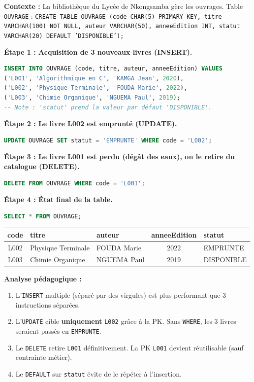 \documentclass[11pt]{article}
\begin{document}
\begin{exoresolu}
\textbf{Contexte :} La bibliothèque du Lycée de Nkongsamba gère les ouvrages. Table \texttt{OUVRAGE} :
\texttt{CREATE TABLE OUVRAGE (code CHAR(5) PRIMARY KEY, titre VARCHAR(100) NOT NULL, auteur VARCHAR(50), anneeEdition INT, statut VARCHAR(20) DEFAULT 'DISPONIBLE');}

\textbf{Étape 1 : Acquisition de 3 nouveaux livres (INSERT).}
\begin{lstlisting}[language=SQL]
INSERT INTO OUVRAGE (code, titre, auteur, anneeEdition) VALUES
('L001', 'Algorithmique en C', 'KAMGA Jean', 2020),
('L002', 'Physique Terminale', 'FOUDA Marie', 2022),
('L003', 'Chimie Organique', 'NGUEMA Paul', 2019);
-- Note : 'statut' prend la valeur par défaut 'DISPONIBLE'.
\end{lstlisting}

\textbf{Étape 2 : Le livre L002 est emprunté (UPDATE).}
\begin{lstlisting}[language=SQL]
UPDATE OUVRAGE SET statut = 'EMPRUNTE' WHERE code = 'L002';
\end{lstlisting}

\textbf{Étape 3 : Le livre L001 est perdu (dégât des eaux), on le retire du catalogue (DELETE).}
\begin{lstlisting}[language=SQL]
DELETE FROM OUVRAGE WHERE code = 'L001';
\end{lstlisting}

\textbf{Étape 4 : État final de la table.}
\begin{lstlisting}[language=SQL]
SELECT * FROM OUVRAGE;
\end{lstlisting}
\begin{center}
\begin{tabular}{|c|l|l|c|l|}
\hline
\textbf{code} & \textbf{titre} & \textbf{auteur} & \textbf{anneeEdition} & \textbf{statut} \\
\hline
L002 & Physique Terminale & FOUDA Marie & 2022 & EMPRUNTE \\
L003 & Chimie Organique & NGUEMA Paul & 2019 & DISPONIBLE \\
\hline
\end{tabular}
\end{center}
\tcblower
\textbf{Analyse pédagogique :}
\begin{enumerate}
    \item L'\texttt{INSERT} multiple (séparé par des virgules) est plus performant que 3 instructions séparées.
    \item L'\texttt{UPDATE} cible \textbf{uniquement} \texttt{L002} grâce à la PK. Sans \texttt{WHERE}, les 3 livres seraient passés en \texttt{EMPRUNTE}.
    \item Le \texttt{DELETE} retire \texttt{L001} définitivement. La PK \texttt{L001} devient réutilisable (sauf contrainte métier).
    \item Le \texttt{DEFAULT} sur \texttt{statut} évite de le répéter à l'insertion.
\end{enumerate}
\end{exoresolu}
\end{document}
